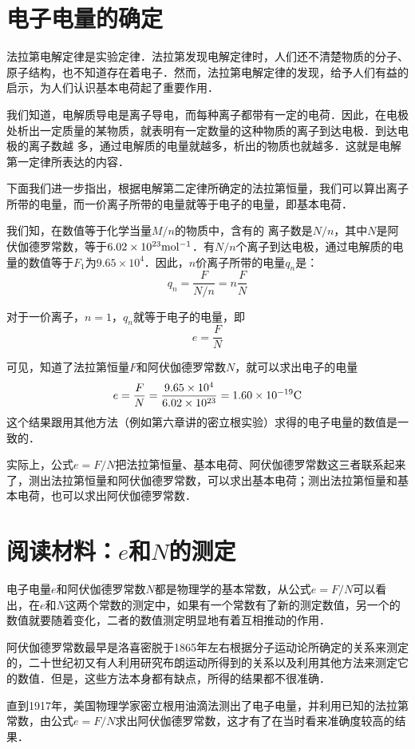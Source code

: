 \section{电子电量的确定}
法拉第电解定律是实验定律．法拉第发现电解定律时，人们还不清楚物质的分子、原子结构，也不知道存在着电子．然而，法拉第电解定律的发现，给予人们有益的启示，为人们认识基本电荷起了重要作用．

我们知道，电解质导电是离子导电，而每种离子都带有一定的电荷．因此，在电极处析出一定质量的某物质，就表明有一定数量的这种物质的离子到达电极．到达电极的离子数越
多，通过电解质的电量就越多，析出的物质也就越多．这就是电解第一定律所表达的内容．

下面我们进一步指出，根据电解第二定律所确定的法拉第恒量，我们可以算出离子所带的电量，而一价离子所带的电量就等于电子的电量，即基本电荷．

我们知，在数值等于化学当量$M/n$的物质中，含有的
离子数是$N/n$，其中$N$是阿伏伽德罗常数，等于$6.02\times10^{23}{\rm mol^{-1}}$．有$N/n$个离子到达电极，通过电解质的电量的数值等于$F_1$为$9.65\times10^4$．因此，$n$价离子所带的电量$q_n$是：
\[q_n=\frac{F}{N/n}=n\frac{F}{N} \]

对于一价离子，$n=1$，$q_n$就等于电子的电量，即
\[e=\frac{F}{N}\]

可见，知道了法拉第恒量$F$和阿伏伽德罗常数$N$，就可以求出电子的电量 
\[e=\frac{F}{N}=\frac{9.65\times10^4}{6.02\times10^{23}}=1.60\times 10^{-19}{\rm C}\]
这个结果跟用其他方法（例如第六章讲的密立根实验）求得的电子电量的数值是一致的．

实际上，公式$e=F/N$把法拉第恒量、基本电荷、阿伏伽德罗常数这三者联系起来了，测出法拉第恒量和阿伏伽德罗常数，可以求出基本电荷；测出法拉第恒量和基本电荷，也可以求出阿伏伽德罗常数．

\section*{阅读材料：$e$和$N$的测定}
电子电量$e$和阿伏伽德罗常数$N$都是物理学的基本常数，从公式$e=F/N$可以看出，在$e$和$N$这两个常数的测定中，如果有一个常数有了新的测定数值，另一个的数值就要随着变化，二者的数值测定明显地有着互相推动的作用．

阿伏伽德罗常数最早是洛喜密脱于1865年左右根据分子运动论所确定的关系来测定的，二十世纪初又有人利用研究布朗运动所得到的关系以及利用其他方法来测定它的数值．但是，这些方法本身都有缺点，所得的结果都不很准确．

直到1917年，美国物理学家密立根用油滴法测出了电子电量，并利用已知的法拉第常数，由公式$e=F/N$求出阿伏伽德罗常数，这才有了在当时看来准确度较高的结果．


